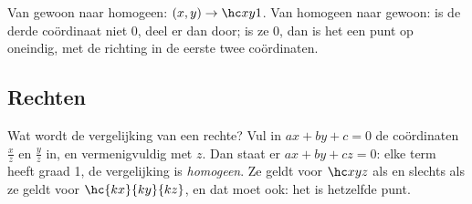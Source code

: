 
\begin{werkwijze}
Van gewoon naar homogeen: $(x, y) \to \hc xy1$. Van homogeen naar gewoon: is de derde coördinaat niet 0, deel er dan door; is ze 0, dan is het een punt op oneindig, met de richting in de eerste twee coördinaten.
\end{werkwijze}


\begin{oefeningen}
\end{oefeningen}

\subsection{Rechten}

Wat wordt de vergelijking van een rechte? Vul in $ax + by + c = 0$ de coördinaten $\tfrac xz$ en $\tfrac yz$ in, en vermenigvuldig met $z$. Dan staat er $ax + by + cz = 0$: elke term heeft graad 1, de vergelijking is \emph{homogeen}. Ze geldt voor $\hc xyz$ als en slechts als ze geldt voor $\hc{kx}{ky}{kz}$, en dat moet ook: het is hetzelfde punt.

